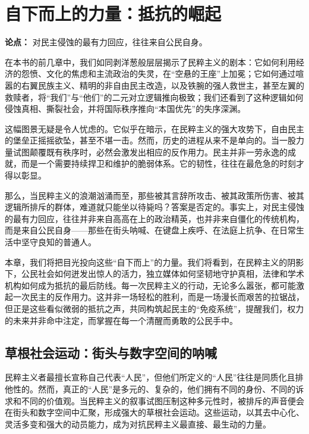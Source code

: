 \chapter{自下而上的力量：抵抗的崛起}

    \textbf{论点：} 对民主侵蚀的最有力回应，往往来自公民自身。

在本书的前几章中，我们如同剥洋葱般层层揭示了民粹主义的剧本：它如何利用经济的怨愤、文化的焦虑和主流政治的失灵，在“空悬的王座”上加冕；它如何通过喧嚣的右翼民族主义、精明的非自由民主改造，以及铁腕的强人救世主，甚至左翼的救赎者，将“我们”与“他们”的二元对立逻辑推向极致；我们还看到了这种逻辑如何侵蚀真相、撕裂社会，并将国际秩序推向“本国优先”的失序深渊。

这幅图景无疑是令人忧虑的。它似乎在暗示，在民粹主义的强大攻势下，自由民主的堡垒正摇摇欲坠，甚至不堪一击。然而，历史的进程从来不是单向的。当一股力量试图颠覆既有秩序时，必然会激发出相应的反作用力。民主并非一劳永逸的成就，而是一个需要持续捍卫和维护的脆弱体系。它的韧性，往往在最危急的时刻才得以彰显。

那么，当民粹主义的浪潮汹涌而至，那些被其言辞所攻击、被其政策所伤害、被其逻辑所排斥的群体，难道就只能坐以待毙吗？答案是否定的。事实上，对民主侵蚀的最有力回应，往往并非来自高高在上的政治精英，也并非来自僵化的传统机构，而是来自公民自身——那些在街头呐喊、在键盘上疾呼、在法庭上抗争、在日常生活中坚守良知的普通人。

本章，我们将把目光投向这些“自下而上”的力量。我们将看到，在民粹主义的阴影下，公民社会如何迸发出惊人的活力，独立媒体如何坚韧地守护真相，法律和学术机构如何成为抵抗的最后防线。每一次民粹主义的行动，无论多么嚣张，都可能激起一次民主的反作用力。这并非一场轻松的胜利，而是一场漫长而艰苦的拉锯战，但正是这些看似微弱的抵抗之声，共同构筑起民主的“免疫系统”，提醒我们，权力的未来并非命中注定，而掌握在每一个清醒而勇敢的公民手中。

\section{草根社会运动：街头与数字空间的呐喊}

民粹主义者最擅长宣称自己代表“人民”，但他们所定义的“人民”往往是同质化且排他性的。然而，真正的“人民”是多元的、复杂的，他们拥有不同的身份、不同的诉求和不同的价值观。当民粹主义的叙事试图压制这种多元性时，被排斥的声音便会在街头和数字空间中汇聚，形成强大的草根社会运动。这些运动，以其去中心化、灵活多变和强大的动员能力，成为对抗民粹主义最直接、最生动的力量。

